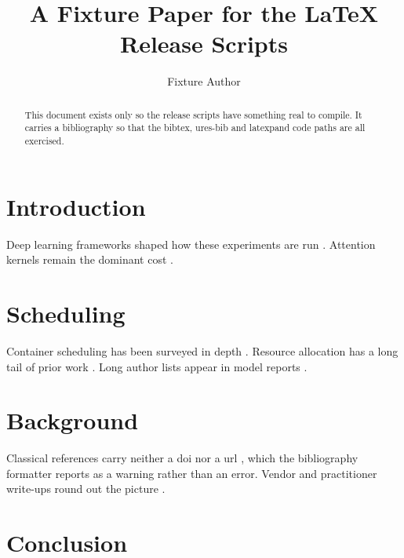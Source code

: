 \documentclass[11pt]{article}
\title{A Fixture Paper for the LaTeX Release Scripts}
\author{Fixture Author}
\date{}
\begin{document}
\maketitle

\begin{abstract}
This document exists only so the release scripts have something real to compile.
It carries a bibliography so that the bibtex, ures-bib and latexpand code paths are
all exercised.
\end{abstract}

\section{Introduction}
Deep learning frameworks shaped how these experiments are run
\cite{paszkePyTorchImperativeStyle2019, anselPyTorch2Faster2024}.
Attention kernels remain the dominant cost \cite{dao2022flashattention}.

\section{Scheduling}
Container scheduling has been surveyed in depth
\cite{carrionKubernetesSchedulingTaxonomy2022, harichaneProposalKubernetesScheduler2020}.
Resource allocation has a long tail of prior work
\cite{hassannatajjoloudariResourceAllocationProblem2024}.
Long author lists appear in model reports \cite{grattafioriLlama3Herd2024}.

\section{Background}
Classical references carry neither a doi nor a url
\cite{bishopNeuralNetworksPattern1995}, which the bibliography formatter
reports as a warning rather than an error.
Vendor and practitioner write-ups round out the picture
\cite{shahMemoryOptimizationDeep2020}.

\section{Conclusion}



\end{document}
